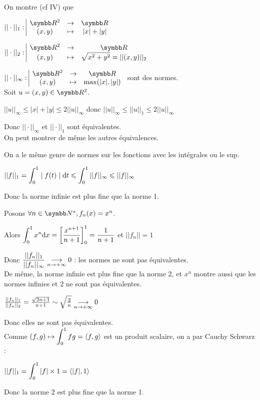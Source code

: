 \begin{exemple}
    On montre (cf IV) que 

    $\fonction{|| \cdot ||_1}{\R^2}{\R}{(x, y)}{|x| + |y|}$

    $\fonction{|| \cdot ||_2}{\R^2}{\R}{(x, y)}{\sqrt{x^2 + y^2} = ||(x, y)||_2}$

    $\fonction{|| \cdot ||_\infty}{\R^2}{\R}{(x, y)}{\max (|x|, |y|)}$
    sont des normes. \\

    Soit $u = (x, y) \in \R^2$. 

    $|| u ||_\infty \leqslant |x| + |y| \leqslant 2 ||u||_\infty$
    donc $|| u ||_\infty \leqslant ||u||_1 \leqslant 2 ||u||_\infty$

    Donc $|| \cdot ||_\infty$ et $|| \cdot ||_1$ sont équivalentes. \\

    On peut montrer de même les autres équivalences.
\end{exemple}

\begin{exemple}
    On a le même genre de normes sur les fonctions avec les intégrales ou le sup. 

    $\displaystyle ||f||_1 = \int_{0}^{1} \mid f(t) \mid \text d t \leqslant \int_{0}^{1} ||f||_\infty \leqslant ||f ||_\infty$

    Donc la norme infinie est plus fine que la norme 1. 

    Posons $\forall n \in \N^*, f_n (x) = x^n$. 

    Alors $\displaystyle \int_{0}^{1} x^n \text d x = \left[\frac {x^{n + 1}}{n+ 1}\right]_0^1 = \frac 1 {n + 1}$
    et $||f_n|| = 1$

    Donc $\displaystyle \frac{||f_n||_1}{||f_n||_\infty} \underset{n \to + \infty}{\longrightarrow} 0$ : les normes ne sont pas équivalentes. \\

    De même, la norme infinie est plus fine que la norme 2, et $x^n$ montre aussi 
    que les normes infinies et 2 ne sont pas équivalentes.

    $\frac{||f_n||_1}{||f_n||_2} = \frac{\sqrt{2n + 1}}{n+1} \sim \sqrt{\frac 2 n} \underset{n \to + \infty}{\longrightarrow} 0$

    Donc elles ne sont pas équivalentes. \\

    Comme $\displaystyle (f, g) \mapsto \int_{0}^{1}fg = \langle f, g \rangle$ est un produit scalaire, on 
    a par Cauchy Schwarz : 

    $\displaystyle ||f||_1 = \int_{0}^{1} |f| \times 1 = \langle |f|, 1 \rangle$

        Donc la norme 2 est plus fine que la norme 1. 
\end{exemple}

